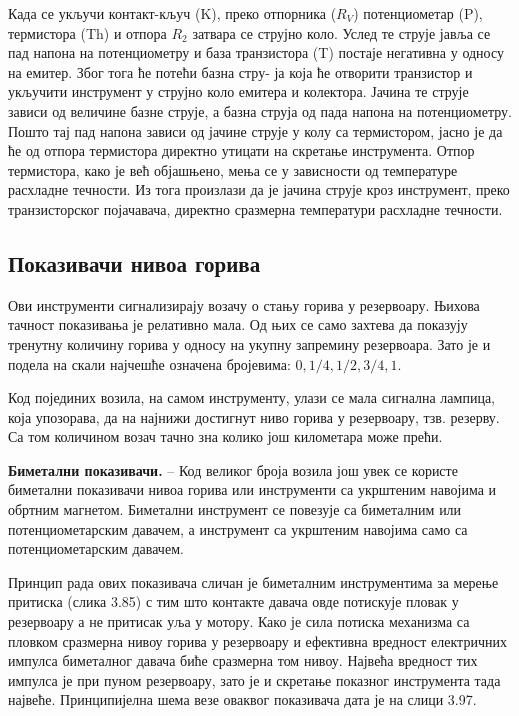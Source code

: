 \documentclass[12pt,a4paper]{report}
\begin{document}

Када се укључи контакт-кључ (K), преко отпорника ($R_V$) потенциометар (P), термистора (Th) и отпора $R_2$ затвара се струјно коло. Услед те струје јавља се пад напона на потенциометру и база транзистора (T) постаје негативна у односу на емитер. Због тога ће потећи базна стру-%
ја која ће отворити транзистор и укључити инструмент у струјно коло емитера и колектора. Јачина те струје зависи од величине базне струје, а базна струја од пада напона на потенциометру. Пошто тај пад напона зависи од јачине струје у колу са термистором, јасно је да ће од отпора термистора директно утицати на скретање инструмента. Отпор термистора, како је већ објашњено, мења се у зависности од температуре расхладне течности. Из тога произлази да је јачина струје кроз инструмент, преко транзисторског појачавача, директно сразмерна температури расхладне течности.

\subsection{Показивачи нивоа горива}

Ови инструменти сигнализирају возачу о стању горива у резервоару. Њихова тачност показивања је релативно мала. Од њих се само захтева да показују тренутну количину горива у односу на укупну запремину резервоара. Зато је и подела на скали најчешће означена бројевима: $0, 1/4, 1/2, 3/4, 1$.

Код појединих возила, на самом инструменту, улази се мала сигнална лампица, која упозорава, да на најнижи достигнут ниво горива у резервоару, тзв. резерву. Са том количином возач тачно зна колико још километара може прећи.

\textbf{Биметални показивачи.} – Код великог броја возила још увек се користе биметални показивачи нивоа горива или инструменти са укрштеним навојима и обртним магнетом. Биметални инструмент се повезује са биметалним или потенциометарским давачем, а инструмент са укрштеним навојима само са потенциометарским давачем.

Принцип рада ових показивача сличан је биметалним инструментима за мерење притиска (слика 3.85) с тим што контакте давача овде потискује пловак у резервоару а не притисак уља у мотору. Како је сила потиска механизма са пловком сразмерна нивоу горива у резервоару и ефективна вредност електричних импулса биметалног давача биће сразмерна том нивоу. Највећа вредност тих импулса је при пуном резервоару, зато је и скретање показног инструмента тада највеће. Принципијелна шема везе оваквог показивача дата је на слици 3.97.
\end{document}
